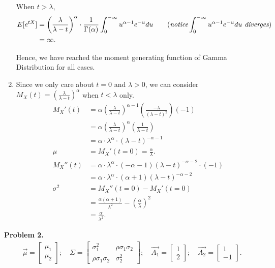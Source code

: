 \documentclass{article}
\begin{document}
\begin{enumerate}[label=(\alph*)]
    When $t > \lambda$,
    \begin{align}
        E[e^{tX}] & = \left(\frac{\lambda}{\lambda-t}\right)^\alpha \cdot \frac{1}{\Gamma (\alpha)}\int_{0}^{-\infty}u^{\alpha-1}e^{-u}du \nonumber \qquad (\emph{notice}\int_{0}^{-\infty}u^{\alpha-1}e^{-u}du \emph{ diverges})\\
        & = \infty. \nonumber
    \end{align}

    Hence, we have reached the moment generating function of Gamma Distribution for all cases.

    \item
    Since we only care about $t=0$ and $\lambda > 0$, we can consider $M_X(t) = \left(\frac{\lambda}{\lambda-t}\right)^\alpha$ when $t < \lambda$ only.
    \begin{align}
        M_X'(t) & = \alpha\left(\frac{\lambda}{\lambda-t}\right)^{\alpha-1}\left(\frac{-\lambda}{(\lambda-t)^2}\right)(-1) \nonumber \\
        & = \alpha\left(\frac{\lambda}{\lambda-t}\right)^{\alpha}\left(\frac{1}{\lambda-t}\right) \nonumber \\
        & = \alpha \cdot \lambda^\alpha\cdot(\lambda-t)^{-\alpha-1} \nonumber \\
        \mu & = M_X'(t=0) = \frac{\alpha}{\lambda}. \nonumber \\
        M_X''(t) & = \alpha \cdot \lambda^\alpha\cdot (-\alpha-1)(\lambda-t)^{-\alpha-2}\cdot(-1) \nonumber \\
        & = \alpha \cdot \lambda^\alpha\cdot (\alpha+1)(\lambda-t)^{-\alpha-2} \nonumber \\
        \sigma^2 & = M_X''(t=0) - M_X'(t=0) \nonumber \\
        & = \frac{\alpha(\alpha+1)}{\lambda^2} - \left(\frac{\alpha}{\lambda}\right)^2 \nonumber \\
        & = \frac{\alpha}{\lambda^2}. \nonumber
    \end{align}
\end{enumerate}
\bigbreak

\textbf{Problem 2.} 
\begin{align}
    \vec{\mu}=
    \begin{bmatrix}
        \mu_1 \\
        \mu_2
    \end{bmatrix}; \quad
    \Sigma=
    \begin{bmatrix}
        \sigma_1^2 & \rho\sigma_1\sigma_2 \\
        \rho\sigma_1\sigma_2 & \sigma_2^2
    \end{bmatrix}; \quad
    \vec{A_1}=
    \begin{bmatrix}
        1 \\
        2 
    \end{bmatrix}; \quad
    \vec{A_2}=
    \begin{bmatrix}
        1 \\
        -1
    \end{bmatrix}. \nonumber
\end{align}
\end{document}
